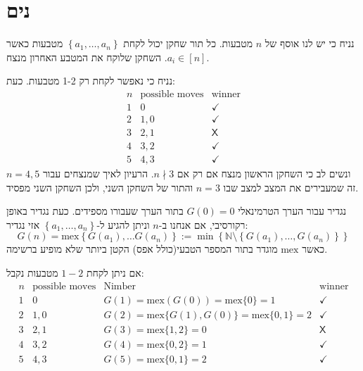 \documentclass{tstextbook}
\begin{document}
\section{נים}

\begin{definition}
נניח כי יש לנו אוסף של \(n\) מטבעות. כל תור שחקן יכול לקחת \(\left\{  a_{1},\dots,a_{n}  \right\}\) מטבעות כאשר \(a_{i}\in [n]\). השחקן שלוקח את המטבע האחרון מנצח.

\end{definition}
\begin{example}
נניח כי נאפשר לקחת רק 1-2 מטבעות. כעת:
$$\begin{array}{c|c|c}n & \text{possible moves} & \text{winner} \\ \hline 1 & 0 & \checkmark \\ \hline2 & 1,0 & \checkmark  \\\hline3 & 2,1 & \mathsf{X} \\ \hline4 & 3,2 & \checkmark \\ \hline5 & 4,3 & \checkmark
\end{array}$$
ונשים לב כי השחקן הראשון מנצח אם רק אם \(n\nmid 3\). הרעיון לאיך שמנצחים עבור \(n=4,5\) זה שמעבירים את המצב למצב שבו \(n=3\) והתור של השחקן השני, ולכן השחקן השני מפסיד.

\end{example}
\begin{definition}
נגדיר עבור הערך הטרמינאלי \(G(0)=0\) בתור הערך שעבורו מספידים. כעת נגדיר באופן רקורסיבי, אם אנחנו ב-\(n\) וניתן להגיע ל-\(\left\{  a_{1},\dots,a_{n}  \right\}\) אזי נגדיר:
$$G(n)=\mathrm{mex}\left\{  G(a_{1}),\dots G(a_{n})  \right\}:= \min \left\{  \mathbb{N}\setminus \left\{  G(a_{1}),\dots,G(a_{n})  \right\}  \right\}$$
כאשר \(\mathrm{mex}\) מוגדר בתור המספר הטבעי(כולל אפס) הקטן ביותר שלא מופיע ברשימה.

\end{definition}
\begin{example}
אם ניתן לקחת \(1-2\) מטבעות נקבל:
$$\begin{array}{c|c|c}n & \text{possible moves} &\text{Nimber}& \text{winner} \\ \hline 1 & 0 & G(1)=\text{mex}(G(0))=\text{mex}\{ 0 \}=1&\checkmark \\ \hline2 & 1,0 &  G(2)=\mathrm{mex}\{ G(1),G(0) \}=\text{mex}\{ 0,1 \}=2& \checkmark  \\\hline3 & 2,1 &  G(3)=\text{mex}\{ 1,2 \}=0& \mathsf{X} \\ \hline4 & 3,2 & G(4)=\text{mex}\{ 0,2 \}= 1& \checkmark \\ \hline5 & 4,3 & G(5)=\text{mex}\{ 0,1 \}=2&  \checkmark
\end{array}$$

\end{example}
\end{document}
